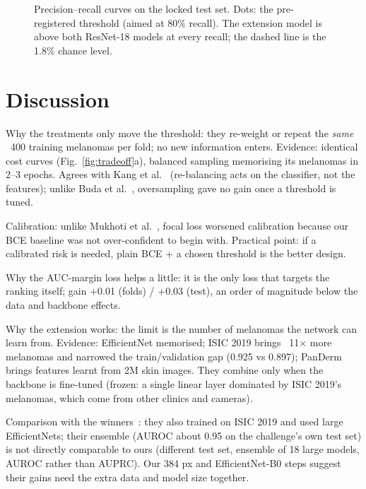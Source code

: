 \begin{figure}[t]
\centering
{}
\caption{Precision--recall curves on the locked test set. Dots: the pre-registered threshold (aimed at 80\% recall). The extension model is above both ResNet-18 models at every recall; the dashed line is the 1.8\% chance level.}
\label{fig:test}
\end{figure}

\section{Discussion}
\label{sec:discussion}
\begin{notes}
  \item Why the treatments only move the threshold: they re-weight or repeat the \emph{same} ~400 training melanomas per fold; no new information enters. Evidence: identical cost curves (Fig.~\ref{fig:tradeoff}a), balanced sampling memorising its melanomas in 2--3 epochs. Agrees with Kang et al.~\cite{kang2020decoupling} (re-balancing acts on the classifier, not the features); unlike Buda et al.~\cite{buda2018systematic}, oversampling gave no gain once a threshold is tuned.
  \item Calibration: unlike Mukhoti et al.~\cite{mukhoti2020calibrating}, focal loss worsened calibration because our BCE baseline was not over-confident to begin with. Practical point: if a calibrated risk is needed, plain BCE + a chosen threshold is the better design.
  \item Why the AUC-margin loss helps a little: it is the only loss that targets the ranking itself; gain +0.01 (folds) / +0.03 (test), an order of magnitude below the data and backbone effects.
  \item Why the extension works: the limit is the number of melanomas the network can learn from. Evidence: EfficientNet memorised; ISIC 2019 brings ~11$\times$ more melanomas and narrowed the train/validation gap (0.925 vs 0.897); PanDerm brings features learnt from 2M skin images. They combine only when the backbone is fine-tuned (frozen: a single linear layer dominated by ISIC 2019's melanomas, which come from other clinics and cameras).
  \item Comparison with the winners~\cite{ha2020identifying}: they also trained on ISIC 2019 and used large EfficientNets; their ensemble (AUROC about 0.95 on the challenge's own test set) is not directly comparable to ours (different test set, ensemble of 18 large models, AUROC rather than AUPRC). Our 384 px and EfficientNet-B0 steps suggest their gains need the extra data and model size together.

\end{notes}

